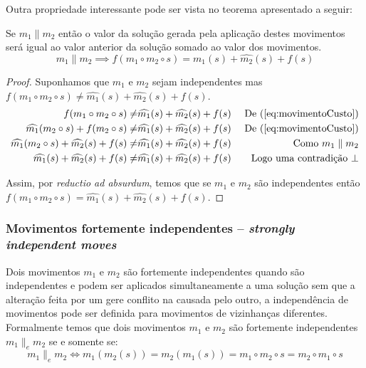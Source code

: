 Outra propriedade interessante pode ser vista no teorema apresentado a seguir:
\begin{theorem}\label{teo:independenciaMovimentos2a2}
Se $m_1 \parallel m_2$ então o valor da solução gerada pela aplicação destes movimentos será igual ao valor anterior da solução somado ao valor dos movimentos.
\begin{equation}
\label{eq:movimentoCustoSomaDois}
m_1 \parallel m_2 \implies f(m_1 \circ m_2 \circ s) = \widehat{m_1}(s) + \widehat{m_2}(s) + f(s)
\end{equation}
\begin{proof}
    Suponhamos que $m_1$ e $m_2$ sejam independentes mas $f(m_1 \circ m_2 \circ s) \neq \widehat{m_1}(s) + \widehat{m_2}(s) + f(s)$.
    \begin{align*}
        f(m_1 \circ m_2 \circ s) \neq & \widehat{m_1}(s) + \widehat{m_2}(s) + f(s) & \textrm{ De } (\ref{eq:movimentoCusto}) \\
        \widehat{m_1}(m_2 \circ s) + f(m_2 \circ s) \neq & \widehat{m_1}(s) + \widehat{m_2}(s) + f(s) & \textrm{ De } (\ref{eq:movimentoCusto}) \\
        \widehat{m_1}(m_2 \circ s) + \widehat{m_2}(s) + f(s) \neq & \widehat{m_1}(s) + \widehat{m_2}(s) + f(s) & \textrm{ Como } m_1 \parallel m_2 \\
        \widehat{m_1}(s) + \widehat{m_2}(s) + f(s) \neq & \widehat{m_1}(s) + \widehat{m_2}(s) + f(s) & \textrm{ Logo uma contradição } \bot
    \end{align*}
    
    Assim, por \textit{reductio ad absurdum}, temos que se $m_1$ e $m_2$ são independentes então $f(m_1 \circ m_2 \circ s) = \widehat{m_1}(s) + \widehat{m_2}(s) + f(s)$.
\end{proof}
\end{theorem}

\subsubsection{Movimentos fortemente independentes -- \emph{strongly independent moves}} \label{subsubsec:movimentosEstritamenteIndependentes}

Dois movimentos $m_1$ e $m_2$ são fortemente independentes quando são independentes e podem ser aplicados simultaneamente a uma solução sem que a alteração feita por um gere conflito na causada pelo outro, a independência de movimentos pode ser definida para movimentos de vizinhanças diferentes.
Formalmente temos que dois movimentos $m_1$ e $m_2$ são fortemente independentes $m_1 \parallel_e m_2$ se e somente se:
\begin{equation}  \label{eq:movimentosIndependentes}
m_1 \parallel_e m_2 \iff m_1(m_2(s)) = m_2(m_1(s)) = m_1 \circ m_2 \circ s = m_2 \circ m_1 \circ s
\end{equation}

